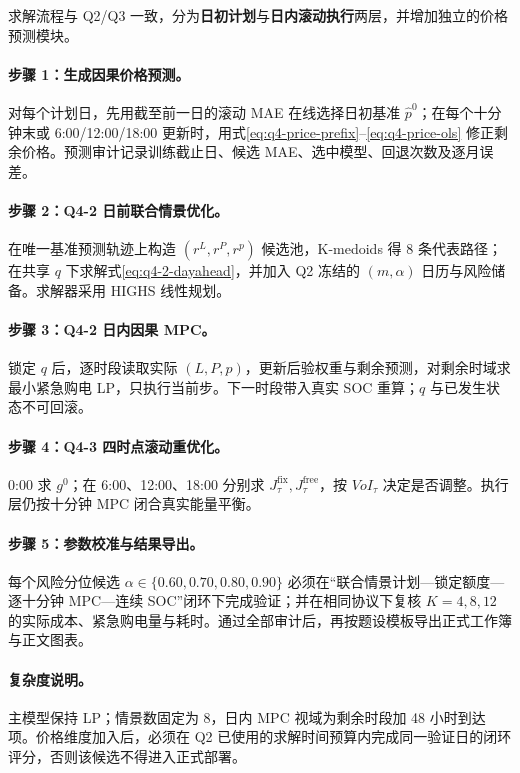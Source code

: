 求解流程与 Q2/Q3 一致，分为\textbf{日初计划}与\textbf{日内滚动执行}两层，并增加独立的价格预测模块。

\paragraph{步骤 1：生成因果价格预测。}对每个计划日，先用截至前一日的滚动 MAE 在线选择日初基准 $\widehat p^0$；在每个十分钟末或 6:00/12:00/18:00 更新时，用式\eqref{eq:q4-price-prefix}--\eqref{eq:q4-price-ols} 修正剩余价格。预测审计记录训练截止日、候选 MAE、选中模型、回退次数及逐月误差。

\paragraph{步骤 2：Q4-2 日前联合情景优化。}在唯一基准预测轨迹上构造 $(r^L,r^P,r^p)$ 候选池，K-medoids 得 8 条代表路径；在共享 $q$ 下求解式\eqref{eq:q4-2-dayahead}，并加入 Q2 冻结的 $(m,\alpha)$ 日历与风险储备。求解器采用 HIGHS 线性规划。

\paragraph{步骤 3：Q4-2 日内因果 MPC。}锁定 $q$ 后，逐时段读取实际 $(L,P,p)$，更新后验权重与剩余预测，对剩余时域求最小紧急购电 LP，只执行当前步。下一时段带入真实 SOC 重算；$q$ 与已发生状态不可回滚。

\paragraph{步骤 4：Q4-3 四时点滚动重优化。}0:00 求 $g^0$；在 6:00、12:00、18:00 分别求 $J^{\mathrm{fix}}_\tau,J^{\mathrm{free}}_\tau$，按 $VoI_\tau$ 决定是否调整。执行层仍按十分钟 MPC 闭合真实能量平衡。

\paragraph{步骤 5：参数校准与结果导出。}每个风险分位候选 $\alpha\in\{0.60,0.70,0.80,0.90\}$ 必须在“联合情景计划—锁定额度—逐十分钟 MPC—连续 SOC”闭环下完成验证；并在相同协议下复核 $K=4,8,12$ 的实际成本、紧急购电量与耗时。通过全部审计后，再按题设模板导出正式工作簿与正文图表。

\paragraph{复杂度说明。}主模型保持 LP；情景数固定为 8，日内 MPC 视域为剩余时段加 48 小时到达项。价格维度加入后，必须在 Q2 已使用的求解时间预算内完成同一验证日的闭环评分，否则该候选不得进入正式部署。
